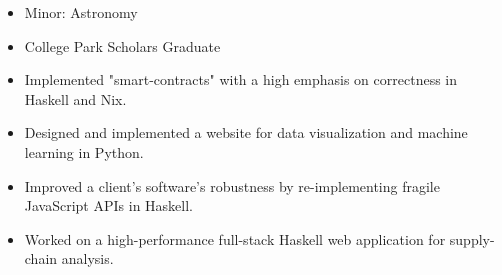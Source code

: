 \documentclass[10pt,a4paper,ragged2e,withhyper]{altacv}
\begin{document}


\makecvheader


\begin{itemize}
\item Minor: Astronomy
\item College Park Scholars Graduate
\end{itemize}



\begin{itemize}
    \item Implemented "smart-contracts" with a high emphasis on correctness in Haskell and Nix.
    \item Designed and implemented a website for data visualization and machine learning in Python.
    \item Improved a client's software's robustness by re-implementing fragile JavaScript APIs in Haskell.
    \item Worked on a high-performance full-stack Haskell web application for supply-chain analysis.
\end{itemize}

\divider

\end{document}
